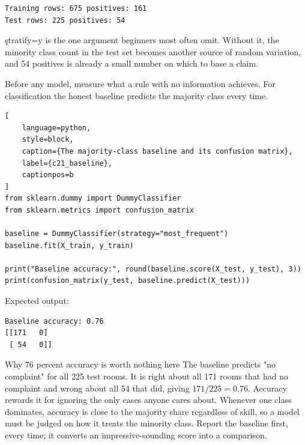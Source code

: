 \begin{lstlisting}[language=text, style=block, caption={Both parts keep the same complaint rate}, label={c21_split_output}, captionpos=b]
Training rows: 675 positives: 161
Test rows: 225 positives: 54
\end{lstlisting}

\c{stratify=y} is the one argument beginners most often omit. Without it, the
minority class count in the test set becomes another source of random variation,
and 54 positives is already a small number on which to base a claim.


Before any model, measure what a rule with no information achieves. For
classification the honest baseline predicts the majority class every time.

\begin{lstlisting}[
    language=python,
    style=block,
    caption={The majority-class baseline and its confusion matrix},
    label={c21_baseline},
    captionpos=b
]
from sklearn.dummy import DummyClassifier
from sklearn.metrics import confusion_matrix

baseline = DummyClassifier(strategy="most_frequent")
baseline.fit(X_train, y_train)

print("Baseline accuracy:", round(baseline.score(X_test, y_test), 3))
print(confusion_matrix(y_test, baseline.predict(X_test)))
\end{lstlisting}

Expected output:

\begin{lstlisting}[language=text, style=block, caption={High accuracy, zero usefulness}, label={c21_baseline_output}, captionpos=b]
Baseline accuracy: 0.76
[[171   0]
 [ 54   0]]
\end{lstlisting}

\begin{ExplainBox}{Why 76 percent accuracy is worth nothing here}
The baseline predicts "no complaint" for all 225 test rooms. It is right about
all 171 rooms that had no complaint and wrong about all 54 that did, giving
$171/225 = 0.76$. Accuracy rewards it for ignoring the only cases anyone cares
about. Whenever one class dominates, accuracy is close to the majority share
regardless of skill, so a model must be judged on how it treats the minority
class. Report the baseline first, every time; it converts an impressive-sounding
score into a comparison.
\end{ExplainBox}

